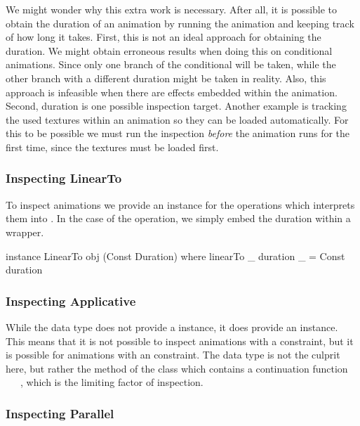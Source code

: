 We might wonder why this extra work is necessary. After all, it is possible to obtain the duration of an animation by running the animation and keeping track of how long it takes. First, this is not an ideal approach for obtaining the duration. We might obtain erroneous results when doing this on conditional animations. Since only one branch of the conditional will be taken, while the other branch with a different duration might be taken in reality. Also, this approach is infeasible when there are effects embedded within the animation. Second, duration is one possible inspection target. Another example is tracking the used textures within an animation so they can be loaded automatically. For this to be possible we must run the inspection \emph{before} the animation runs for the first time, since the textures must be loaded first.

\subsubsection{Inspecting LinearTo}

To inspect animations we provide an instance for the operations which
interprets them into . In the case of the 
operation, we simply embed the duration within a  wrapper.

\begin{code}
instance LinearTo obj (Const Duration) where
  linearTo _ duration _ = Const duration
\end{code}

\subsubsection{Inspecting Applicative}

While the  data type does not provide a  instance, it does
provide an  instance. This means that it is not possible to
inspect animations with a  constraint, but it is possible for
animations with an  constraint. The  data type is not
the culprit here, but rather the \hs{>>=} method of the  class which
contains a continuation function ~\hs{->}~~, which is the
limiting factor of inspection.

\subsubsection{Inspecting Parallel}

